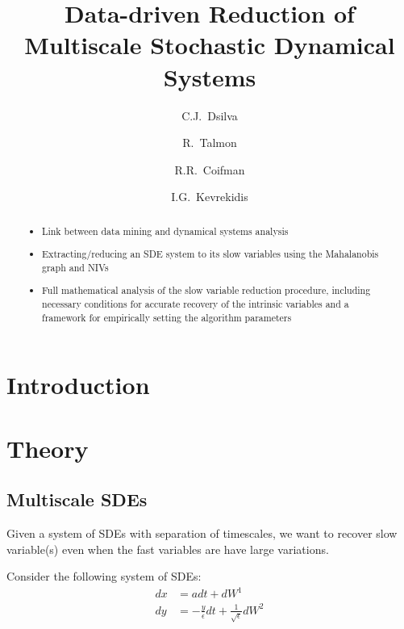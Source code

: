 \documentclass[1p]{elsarticle}
\title{Data-driven Reduction of Multiscale Stochastic Dynamical Systems }
\author[PrincetonCBE]{C.J.~Dsilva}
\author[YaleMath]{R.~Talmon}
\author[YaleMath]{R.R.~Coifman}
\author[PrincetonCBE, PrincetonPACM]{I.G.~Kevrekidis\corref{cor1}}
\begin{document}
\begin{abstract}

\begin{itemize}

\item Link between data mining and dynamical systems analysis

\item Extracting/reducing an SDE system to its slow variables using the Mahalanobis graph and NIVs

\item Full mathematical analysis of the slow variable reduction procedure, including necessary conditions for accurate recovery of the intrinsic variables and a framework for empirically setting the algorithm parameters

\end{itemize}

\end{abstract}


\begin{keyword}
 
\end{keyword}

\maketitle

\section{Introduction}

\section{Theory}

\subsection{Multiscale SDEs}

Given a system of SDEs with separation of timescales, we want to recover slow variable(s) even when the fast variables are have large variations.

Consider the following system of SDEs:
\begin{equation} \label{eq:fast_slow_SDE}
\begin{aligned}
dx &= adt + dW^1\\
dy &= -\frac{y}{\epsilon} dt + \frac{1}{\sqrt{\epsilon}} dW^2
\end{aligned}
\end{equation}
\end{document}
